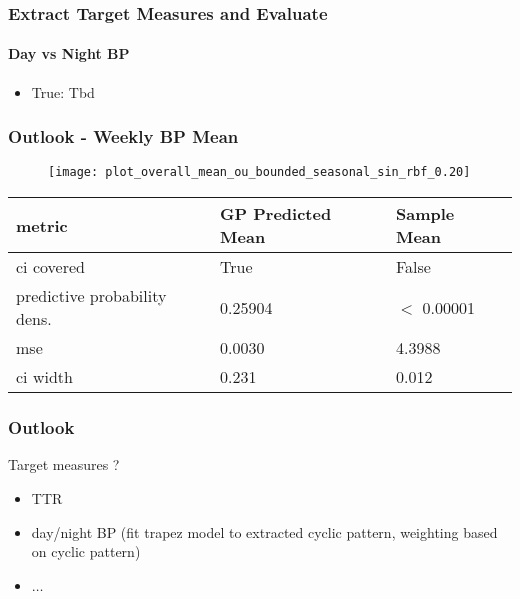\documentclass[
	8pt, %
]{beamer}
\begin{document}
\begin{frame}
	\frametitle{Extract Target Measures and Evaluate}
	\framesubtitle{Day vs Night BP} %
	\begin{itemize}
			\item True: Tbd
	\end{itemize}

\end{frame}




\begin{frame}
	\frametitle{Outlook - Weekly BP Mean}
	\begin{figure}
		\texttt{[image: plot\_overall\_mean\_ou\_bounded\_seasonal\_sin\_rbf\_0.20]}
	\end{figure}


	\begin{table}
		\begin{tabular}{l l l}
			\toprule
			\textbf{metric} & \textbf{GP Predicted Mean} & \textbf{Sample Mean}\\
			\midrule
			ci covered & True & False \\
			predictive probability dens. & 0.25904 & $<$ 0.00001 \\
			mse & 0.0030 & 4.3988 \\
			ci width &  0.231 & 0.012 \\
			\bottomrule
		\end{tabular}


	\end{table}


\end{frame}


\begin{frame}
	\frametitle{Outlook}

	Target measures ?
	\begin{itemize}
		\item TTR
		\item day/night BP (fit trapez model to extracted cyclic pattern, weighting based on cyclic pattern)
		\item $\dots$
	\end{itemize}

\end{frame}
\end{document}
